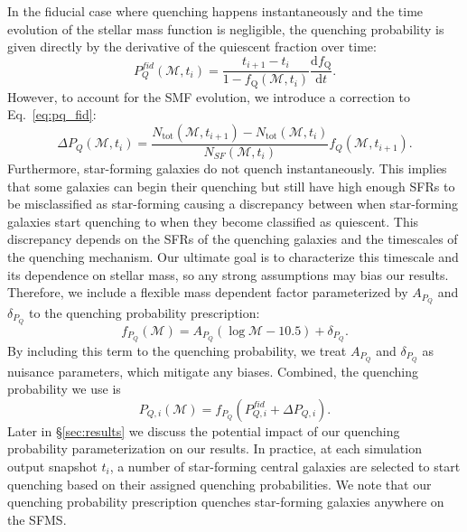 \documentclass[iop,apj,tighten,twocolappendix,numberedappendix]{emulateapj}
\newcommand{\beq}{\begin{equation}}
\newcommand{\eeq}{\end{equation}}
\begin{document}
In the fiducial case where quenching happens instantaneously and 
the time evolution of the stellar mass function is negligible, the 
quenching probability is given directly by the derivative of the 
quiescent fraction over time: 
\beq \label{eq:pq_fid}
P^{fid}_{Q}(\mathcal{M}, t_i) = \frac{t_{i+1} - t_i}{1 - f_\mathrm{Q}(\mathcal{M}, t_i)} \frac{\mathrm{d}f_\mathrm{Q}}{\mathrm{d}t}.
\eeq
However, to account for the SMF evolution, we introduce a correction 
to Eq.~\ref{eq:pq_fid}: 
\beq
\Delta P_{Q}(\mathcal{M}, t_i) = \frac{N_\mathrm{tot}(\mathcal{M}, t_{i+1})-N_\mathrm{tot}(\mathcal{M}, t_{i})}{N_{SF}(\mathcal{M}, t_i)} f_Q(\mathcal{M}, t_{i+1}).
\eeq
Furthermore, star-forming galaxies do not quench instantaneously. 
This implies that some galaxies can begin their quenching 
but still have high enough SFRs to be misclassified as star-forming
causing a discrepancy between when star-forming galaxies start quenching 
to when they become classified as quiescent. This discrepancy depends 
on the SFRs of the quenching galaxies and the timescales of the quenching 
mechanism. Our ultimate goal is to characterize this timescale and its 
dependence on stellar mass, so any strong assumptions may bias our results. 
Therefore, we include a flexible mass dependent factor parameterized by 
$A_{P_Q}$ and $\delta_{P_Q}$ to the quenching probability prescription:
\beq \label{eq:fpq}
f_{P_Q}(\mathcal{M}) = A_{P_Q} (\log\mathcal{M} - 10.5) + \delta_{P_Q}. 
\eeq
By including this term to the quenching probability, we treat $A_{P_Q}$ 
and $\delta_{P_Q}$ as nuisance parameters, which mitigate any biases. 
Combined, the quenching probability we use is
\beq \label{eq:our_pq}
P_{Q,i}(\mathcal{M}) = f_{P_Q} \left(P^{fid}_{Q,i} + \Delta P_{Q,i} \right).
\eeq
Later in \S \ref{sec:results} we discuss the potential impact of our 
quenching probability parameterization on our results. In practice, at 
each simulation output snapshot $t_i$, a number of star-forming central
galaxies are selected to start quenching based on their assigned quenching
probabilities. We note that our quenching probability prescription quenches 
star-forming galaxies anywhere on the SFMS. 
\end{document}
